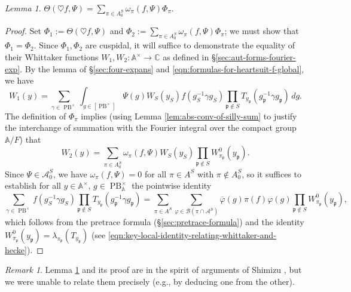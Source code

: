 \documentclass[reqno,10pt]{amsart}
\theoremstyle{plain} %
\theoremstyle{definition}
\theoremstyle{plain} %
\theoremstyle{remark}
\newtheorem*{remark*}            {Remark}
\theoremstyle{itplain} %
\newtheorem{lemma}{Lemma}
\theoremstyle{remark} %
\numberwithin{equation}{section}
\def\PB{\operatorname{PB}}
\begin{document}
\begin{lemma}\label{lem:fourier-coefficients-of-nontraditional-theta-lifts}
  $\Theta(\heartsuit f,\Psi) = \sum_{\pi \in A_0^S} \omega_\pi( f,\Psi) \Phi_\pi$.
\end{lemma}
\begin{proof}
  Set $\Phi_1 := \Theta(\heartsuit f,\Psi)$ and $\Phi_2 := \sum_{\pi \in A_0^S} \omega_\pi( f,\Psi) \Phi_\pi$; we must show that $\Phi_1 = \Phi_2$.  Since $\Phi_1, \Phi_2$ are cuspidal, it will suffice to demonstrate the equality of their Whittaker functions $W_1, W_2 : \mathbb{A}^\times \rightarrow \mathbb{C}$ as defined in \S\ref{sec:aut-forms-fourier-exp}.  By the lemma of \S\ref{sec:four-expans} and \eqref{eqn:formulas-for-heartsuit-f-global}, we have
  \[
    W_1(y) = \sum_{\gamma \in \PB^\times} \int_{g \in [\PB^\times]} \Psi(g) W_S(y_S) f(g_S^{-1} \gamma g_S) \prod_{\mathfrak{p} \notin S} T_{y_\mathfrak{p}}(g_\mathfrak{p}^{-1} \gamma g_\mathfrak{p}) \,d g.
  \]
  The definition of $\Phi_\pi$ implies (using Lemma \ref{lem:abs-conv-of-silly-sum} to justify the interchange of summation with the Fourier integral over the compact group $\mathbb{A}/F$) that
  \[
    W_2(y) = \sum_{\pi \in A_0^S} \omega_\pi( f,\Psi) W_S(y_S) \prod_{\mathfrak{p} \notin S} W_{\pi_\mathfrak{p}}^0(y_\mathfrak{p}).
  \]
  Since $\Psi \in \mathcal{A}_0^S$, we have $\omega_\pi(f,\Psi) = 0$ for all $\pi \in A^S$ with $\pi \notin A_0^S$, so it suffices to establish for all $y \in \mathbb{A}^\times$, $g \in \PB^\times_{\mathbb{A}}$ the pointwise identity
  \begin{equation*}
    \sum_{\gamma \in \PB^\times} f(g_S^{-1} \gamma g_S) \prod_{\mathfrak{p} \notin S} T_{y_\mathfrak{p}}(g_\mathfrak{p}^{-1} \gamma g_\mathfrak{p}) = \sum_{\pi \in A^S}  \sum_{\varphi \in \mathcal{B}(\pi \cap \mathcal{A}^S)} \overline{\varphi}(g) \pi(f) \varphi(g) \prod_{\mathfrak{p} \notin S} W_{\pi_\mathfrak{p}}^0(y_\mathfrak{p}),
  \end{equation*}
  which follows from the pretrace formula (\S\ref{sec:pretrace-formula}) and the identity $W_{\pi_\mathfrak{p}}^0(y_\mathfrak{p}) = \lambda_{\pi_\mathfrak{p}}(T_{y_\mathfrak{p}})$ (see \eqref{eqn:key-local-identity-relating-whittaker-and-hecke}).
\end{proof}

\begin{remark*}
  Lemma \ref{lem:fourier-coefficients-of-nontraditional-theta-lifts} and its proof are in the spirit of arguments of Shimizu \cite[\S4]{MR0333081}, but we were unable to relate them precisely (e.g., by deducing one from the other).
\end{remark*}
\end{document}
